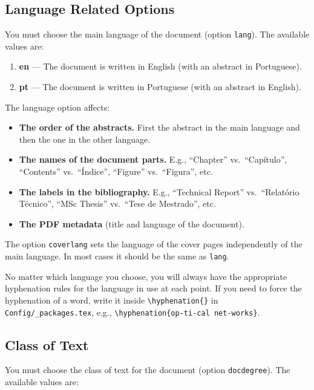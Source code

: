 \subsection{Language Related Options} %
\label{sub:language_related_options}

You must choose the main language of the document (option \texttt{lang}). The available values are:

\begin{enumerate}
	\item \textbf{en} --- The document is written in English (with an abstract in Portuguese).
	\item \textbf{pt} --- The document is written in Portuguese (with an abstract in English).
\end{enumerate}

The language option affects:
\begin{itemize}
	\item \textbf{The order of the abstracts.} First the abstract in the main language and then the one in the other language.
	\item \textbf{The names of the document parts.} E.g., ``Chapter'' vs.\ ``Capítulo'', ``Contents'' vs.\ ``Índice'', ``Figure'' vs.\ ``Figura'', etc.
	\item \textbf{The labels in the bibliography.} E.g., ``Technical Report'' vs.\ ``Relatório Técnico'', ``MSc Thesis'' vs.\ ``Tese de Mestrado'', etc.
	\item \textbf{The PDF metadata} (title and language of the document).
\end{itemize}

The option \texttt{coverlang} sets the language of the cover pages independently of the main language. In most cases it should be the same as \texttt{lang}.

No matter which language you choose, you will always have the appropriate hyphenation rules for the language in use at each point. If you need to force the hyphenation of a word, write it inside \verb!\hyphenation{}! in \texttt{Config/\_packages.tex}, e.g., \verb!\hyphenation{op-ti-cal net-works}!.

\subsection{Class of Text} %
\label{sub:class_of_text}

You must choose the class of text for the document (option \texttt{docdegree}). The available values are:

